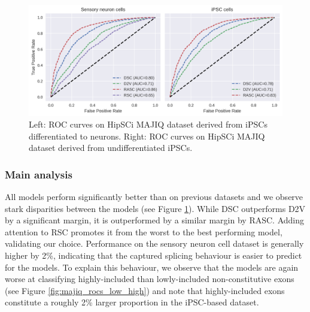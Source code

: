 \begin{figure}
	\centering\includegraphics[width=1\textwidth]{../visualizations/ch5-results/majiq_neuron_ipsc_cross_model_roc_auc_comparison.png} 
	\caption{Left: ROC curves on HipSCi MAJIQ dataset derived from iPSCs differentiated to neurons. Right: ROC curves on HipSCi MAJIQ dataset derived from undifferentiated iPSCs. }
	\label{fig:majiq_rocs}
\end{figure}

\subsubsection{Main analysis}
All models perform significantly better than on previous datasets and we observe stark disparities between the models (see Figure \ref{fig:majiq_rocs}). While DSC outperforms D2V by a significant margin, it is outperformed by a similar margin by RASC. Adding attention to RSC promotes it from the worst to the best performing model, validating our choice. Performance on the sensory neuron cell dataset is generally higher by 2\%, indicating that the captured splicing behaviour is easier to predict for the models. To explain this behaviour, we observe that the models are again worse at classifying highly-included than lowly-included non-constitutive exons (see Figure \ref{fig:majiq_rocs_low_high}) and note that highly-included exons constitute a roughly 2\% larger proportion in the iPSC-based dataset. 





